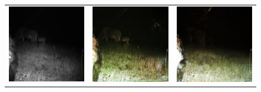 \documentclass[a4paper,11pt, DIV=12]{scrartcl}
\begin{document}
\begin{figure}[ht]
\begin{tabularx}{.69\textwidth}{>{\centering\arraybackslash}X >{\centering\arraybackslash}X >{\centering\arraybackslash}X}
      \includegraphics{S2_C07_R1_PICT0675_real.png} & \includegraphics{S2_C07_R1_PICT0675_cyclegan.png} & \includegraphics{S2_C07_R1_PICT0675_cut.png} \\

\end{tabularx}
\end{figure}
\end{document}
